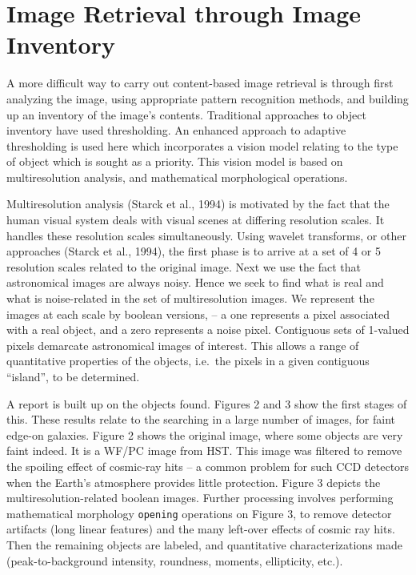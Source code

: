 \section{Image Retrieval through Image Inventory}

A more difficult way to carry out content-based image retrieval is 
through first analyzing the image, using appropriate pattern recognition
methods, and building up an inventory of the image's contents.  
Traditional approaches to object inventory have used thresholding.  An
enhanced approach to adaptive thresholding is used here which incorporates 
a vision model relating to the type of object which is sought as a priority.
This vision model is based on multiresolution analysis, and mathematical 
morphological operations.

Multiresolution analysis (Starck et al., 1994)
is motivated by the fact that the human visual system deals with visual
scenes at differing resolution scales.  It handles these resolution scales 
simultaneously.  Using wavelet transforms, or other approaches (Starck et al.,
1994), the first phase is to arrive at a set of 4 or 5 resolution scales
related to the original image.  Next we use the fact that astronomical images
are always noisy.  Hence we seek to find what is real and what is noise-related
in the set of multiresolution images.  We represent the images at each scale
by boolean versions, -- a one represents a pixel associated with a real 
object, and a zero represents a noise pixel.  Contiguous sets of 1-valued 
pixels demarcate astronomical images of interest.  This allows a range of 
quantitative properties of the objects, i.e.\ the pixels in a given contiguous
``island'', to be determined.  

A report is built up on the objects found.
Figures 2 and 3 show the first stages of this.  These results relate to the 
searching in a large number of images, for faint edge-on galaxies.  
Figure 2 shows the original image, where some objects are very faint indeed.
It is a WF/PC image from HST. 
This image was filtered to remove the spoiling effect of cosmic-ray hits --
a common problem for such CCD detectors when the Earth's atmosphere provides
little protection.  Figure 3 depicts the 
multiresolution-related boolean images.
Further processing involves performing mathematical morphology {\tt opening}
operations on Figure 3, to remove detector artifacts (long linear features)
and the many left-over effects of cosmic ray hits.  Then the remaining objects
are labeled, and quantitative characterizations made (peak-to-background
intensity, roundness, moments, ellipticity, etc.).  


